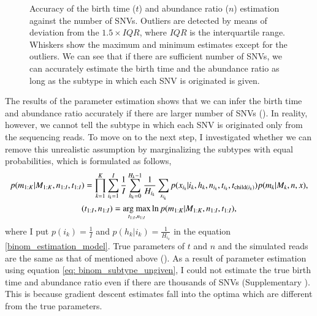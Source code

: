 \documentclass{article}
\begin{document}
\begin{figure}[H]
   \caption{
 Accuracy of the birth time ($t$) and abundance ratio ($n$) estimation against the number of SNVs. Outliers are detected by means of deviation from the $1.5 \times IQR$, where $IQR$ is the interquartile range. Whiskers show the maximum and minimum estimates except for the outliers. We can see that if there are sufficient number of SNVs, we can accurately estimate the birth time and the abundance ratio as long as the subtype in which each SNV is originated is given.
  }
 \label{fig: binom_subtype_given}
\end{figure}

The results of the parameter estimation shows that we can infer the birth time and abundance ratio accurately if there are larger number of SNVs ().
In reality, however, we cannot tell the subtype in which each SNV is originated only from the sequencing reads.
To move on to the next step, I investigated whether we can remove this unrealistic assumption by marginalizing the subtypes with equal probabilities, which is formulated as follows,
\begin{gather}
 p(m_{1:K}|M_{1:K}, n_{1:I}, t_{1:I}) = \prod_{k=1}^{K} \sum_{i_k=1}^{I} \frac{1}{I} \sum_{h_k=0}^{H_k-1} \frac{1}{H_{i_k}} \sum_{x_{i_k}} p(x_{i_k} | i_k, h_k, n_{i_k}, t_{i_k}, t_{\mathrm{child}(i_k)}) p (m_k | M_k, n, x),\label{eq: binom_subtype_ungiven}\\
 (t_{1:I}, n_{1:I}) = \mathop{\rm arg~max}\limits_{t_{1:I}, n_{1:I}} \ln p(m_{1:K} | M_{1:K}, n_{1:I}, t_{1:I}),
\end{gather}
where I put $p(i_k) = \frac{1}{I}$ and $p(h_k | i_k) = \frac{1}{H_{i_k}}$ in the equation \eqref{binom_estimation_model}.
True parameters of $t$ and $n$ and the simulated reads are the same as that of mentioned above ().
As a result of parameter estimation using equation \eqref{eq: binom_subtype_ungiven}, I could not estimate the true birth time and abundance ratio even if there are thousands of SNVs (Supplementary ).
This is because gradient descent estimates fall into the optima which are different from the true parameters.
\end{document}
